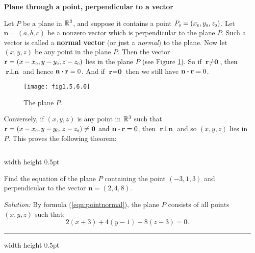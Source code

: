 \par\noindent\textbf{\large{Plane through a point, perpendicular to a vector}}\normalsize\vspace{1.5mm}

Let $P$ be a plane in $\mathbb{R}^{3}$, and suppose it contains a point
$P_{\scriptscriptstyle 0} = (x_{\scriptscriptstyle 0},y_{\scriptscriptstyle 0},z_{\scriptscriptstyle 0})$. Let $\textbf{n} = (a,b,c)$ be a nonzero vector which is
perpendicular to the plane $P$. Such a vector is called a \textbf{normal vector} (or just a \emph{normal}) to the plane.
 Now let $(x,y,z)$ be any point in the plane $P$. 
Then the vector
$\textbf{r} = (x - x_{\scriptscriptstyle 0},y - y_{\scriptscriptstyle 0},z - z_{\scriptscriptstyle 0})$ lies in the plane $P$ (see Figure \ref{fig:planenorm}).
So if $\textbf{r} \ne \textbf{0}$, then $\textbf{r} \perp \textbf{n}$ and hence $\textbf{n} \bm{\cdot} \textbf{r} = 0$.
And if $\textbf{r} = \textbf{0}$ then we still have $\textbf{n} \bm{\cdot} \textbf{r} = 0$.

\begin{figure}[h]
 \begin{center}
  \texttt{[image: fig1.5.6.0]}
 \end{center}\vspace{-5mm}
 \caption[]{\quad The plane $P$.}
 \label{fig:planenorm}
\end{figure}

Conversely, if $(x,y,z)$ is any point in $\mathbb{R}^{3}$ such that $\textbf{r} = (x - x_{\scriptscriptstyle 0},y - y_{\scriptscriptstyle 0},z -
z_{\scriptscriptstyle 0}) \ne \textbf{0}$ and $\textbf{n} \bm{\cdot} \textbf{r} = 0$, then $\textbf{r} \perp \textbf{n}$ and
so $(x,y,z)$ lies in $P$. This proves the following theorem:

\hrule width \textwidth height 0.5pt
\begin{exmp}\label{exmp:pointnormal}
 Find the equation of the plane $P$ containing the point $(-3,1,3)$ and perpendicular to the vector $\textbf{n} =
 (2,4,8)$.\vspace{1mm}
 \par\noindent\emph{Solution:} By formula (\ref{eqn:pointnormal}), the plane $P$ consists of all points $(x,y,z)$ such
 that:
 \begin{displaymath}
  2(x + 3) + 4(y - 1) + 8(z - 3) = 0.
 \end{displaymath}
\end{exmp}
\hrule width \textwidth height 0.5pt
\vspace{2mm}

